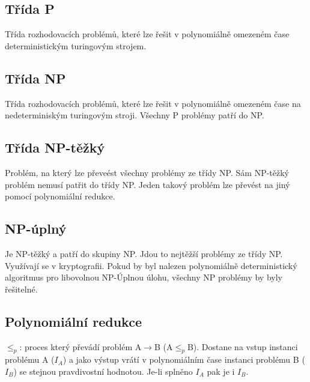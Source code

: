 \documentclass{szzclass}
\begin{document}
\subsection{Třída P}
Třída rozhodovacích problémů, které lze řešit v polynomiálně omezeném čase deterministickým turingovým strojem.
\subsection{Třída NP}
Třída rozhodovacích problémů, které lze řešit v polynomiálně omezeném čase na nedeterminiským turingovým stroji.
Všechny P problémy patří do NP.
\subsection{Třída NP-těžký}
Problém, na který lze převeést všechny problémy ze třídy NP. Sám NP-těžký problém nemusí patřit do třídy NP.
Jeden takový problém lze převést na jiný pomocí polynomiální redukce.
\subsection{NP-úplný}
Je NP-těžký a patří do skupiny NP. Jdou to nejtěžší problémy ze třídy NP. Využívají se v kryptografii.
\newline
Pokud by byl nalezen polynomiálně deterministický algoritmus pro libovolnou NP-Úplnou úlohu, všechny NP problémy by byly řešitelné.
\subsection{Polynomiální redukce}
$\leq_p$: proces který převádí problém A$\rightarrow$B (A$\leq_p$B). Dostane na vstup instanci problému A ($I_A$) a jako výstup vrátí v polynomiálním čase instanci problému B ($I_B$)
se stejnou pravdivostní hodnotou. Je-li splněno $I_A$ pak je i $I_B$. 
\end{document}
